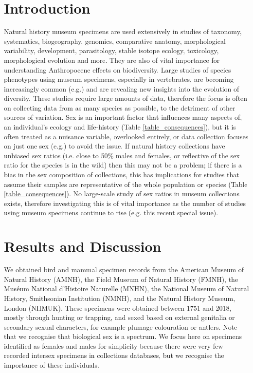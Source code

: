 \documentclass[a4paper, 12pt]{article}
\begin{document}
\section{Introduction}\label{intro}
Natural history museum specimens are used extensively in studies of taxonomy, systematics, biogeography, genomics, comparative anatomy, morphological variability, development, parasitology, stable isotope ecology, toxicology, morphological evolution and more\cite{lister2011natural,pyke2010biological,mclean2015natural}. 
They are also of vital importance for understanding Anthropocene effects on biodiversity\cite{meineke2018biological}. 
Large studies of species phenotypes using museum specimens, especially in vertebrates, are becoming increasingly common (e.g.\cite{cooney2017mega,felice2018developmental}) and are revealing new insights into the evolution of diversity. 
These studies require large amounts of data, therefore the focus is often on collecting data from as many species as possible, to the detriment of other sources of variation. 
Sex is an important factor that influences many aspects of, an individual's ecology and life-history (Table \ref{table_consequences}), but it is often treated as a nuisance variable, overlooked entirely, or data collection focuses on just one sex (e.g.\cite{cooper2009factors}) to avoid the issue. 
If natural history collections have unbiased sex ratios (i.e. close to 50\% males and females, or reflective of the sex ratio for the species is in the wild\cite{karlin1986theoretical}) then this may not be a problem; if there is a bias in the sex composition of collections, this has implications for studies that assume their samples are representative of the whole population or species (Table \ref{table_consequences}). 
No large-scale study of sex ratios in museum collections exists, therefore investigating this is of vital importance as the number of studies using museum specimens continue to rise (e.g. this recent special issue\cite{meineke2018biological}).

\newpage
\begin{landscape}
  
\end{landscape}

\newpage
\section{Results and Discussion}
We obtained bird and mammal specimen records from the American Museum of Natural History (AMNH), the Field Museum of Natural History (FMNH), the Mus\'{e}um National d'Histoire Naturelle (MNHN), the National Museum of Natural History, Smithsonian Institution (NMNH), and the Natural History Museum, London (NHMUK). 
These specimens were obtained between 1751 and 2018, mostly through hunting or trapping, and sexed based on external genitalia or secondary sexual characters, for example plumage colouration or antlers. 
Note that we recognise that biological sex is a spectrum\cite{sciam2017}. 
We focus here on specimens identified as females and males for simplicity because there were very few recorded intersex specimens in collections databases, but we recognise the importance of these individuals.
\end{document}
